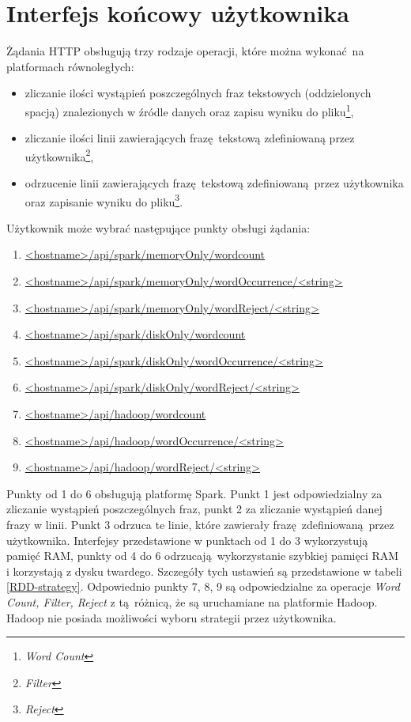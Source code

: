 \section{Interfejs końcowy użytkownika}\label{sec:user_interfaces}
Żądania HTTP obsługują trzy rodzaje operacji, które można wykonać na platformach równoległych:
\begin{itemize}\label{e2e_operations}
	\item {zliczanie ilości wystąpień poszczególnych fraz tekstowych (oddzielonych spacją) znalezionych w źródle danych oraz zapisu wyniku do pliku}\footnote{\textit{Word Count}},
	\item {zliczanie ilości linii zawierających frazę tekstową zdefiniowaną przez użytkownika}\footnote{\textit{Filter}},
	\item {odrzucenie linii zawierających frazę tekstową zdefiniowaną przez użytkownika oraz zapisanie wyniku do pliku}\footnote{\textit{Reject}}.
\end{itemize}
Użytkownik może wybrać następujące punkty obsługi żądania:
\begin{enumerate}
	\item{\url{<hostname>/api/spark/memoryOnly/wordcount}}
	\item{\url{<hostname>/api/spark/memoryOnly/wordOccurrence/<string> }}
	\item{\url{<hostname>/api/spark/memoryOnly/wordReject/<string> }}
	\item{\url{<hostname>/api/spark/diskOnly/wordcount}}
	\item{\url{<hostname>/api/spark/diskOnly/wordOccurrence/<string> }}
	\item{\url{<hostname>/api/spark/diskOnly/wordReject/<string> }}
	\item{\url{<hostname>/api/hadoop/wordcount}}
	\item{\url{<hostname>/api/hadoop/wordOccurrence/<string>}}
	\item{\url{<hostname>/api/hadoop/wordReject/<string> }}
\end{enumerate}
Punkty od 1 do 6 obsługują platformę Spark. Punkt 1 jest odpowiedzialny za zliczanie wystąpień poszczególnych fraz, punkt 2 za zliczanie wystąpień danej frazy w linii. Punkt 3 odrzuca te linie, które zawierały frazę zdefiniowaną przez użytkownika. Interfejsy przedstawione w punktach od 1 do 3 wykorzystują pamięć RAM, punkty od 4 do 6 odrzucają wykorzystanie szybkiej pamięci RAM i korzystają z dysku twardego. Szczegóły tych ustawień są przedstawione w tabeli \ref{RDD-strategy}. Odpowiednio punkty 7, 8, 9 są odpowiedzialne za operacje \textit{Word Count, Filter, Reject} z tą różnicą, że są uruchamiane na platformie Hadoop. Hadoop nie posiada możliwości wyboru strategii przez użytkownika.  

